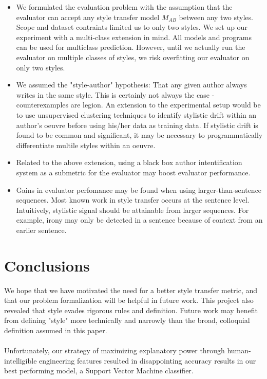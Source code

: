 \documentclass[letterpaper, 10 pt, conference]{ieeeconf}  %
\begin{document}
\begin{itemize}
  \item We formulated the evaluation problem with the assumption that the evaluator can accept any style transfer model $M_{AB}$ between any two styles. Scope and dataset contraints limited us to only two styles. We set up our experiment with a multi-class extension in mind. All models and programs can be used for multiclass prediction. However, until we actually run the evaluator on multiple classes of styles, we risk overfitting our evaluator on only two styles. \\
  \item
  We assumed the "style-author" hypothesis: That any given author always writes in the same style. This is certainly not always the case - counterexamples are legion. An extension to the experimental setup would be to use unsupervised clustering techniques to identify stylistic drift within an author's oeuvre before using his/her data as training data. If stylistic drift is found to be common and significant, it may be necessary to programmatically differentiate multile styles within an oeuvre.\\
  \item 
  Related to the above extension, using a black box author intentification system as a submetric for the evaluator may boost evaluator performance.\\
  \item Gains in evaluator perfomance may be found when using larger-than-sentence sequences. Most known work in style transfer occurs at the sentence level. Intuitively, stylistic signal should be attainable from larger sequences. For example, irony may only be detected in a sentence because of context from an earlier sentence.
\end{itemize}

\section{Conclusions}
We hope that we have motivated the need for a better style transfer metric, and that our problem formalization will be helpful in future work. This project also revealed that style evades rigorous rules and definition. Future work may benefit from defining "style" more technically and narrowly than the broad, colloquial definition assumed in this paper.
\\ \\
Unfortunately, our strategy of maximizing explanatory power through human-intelligible engineering features resulted in disappointing accuracy results in our best performing model, a Support Vector Machine classifier.
\\
\\ 
\end{document}
